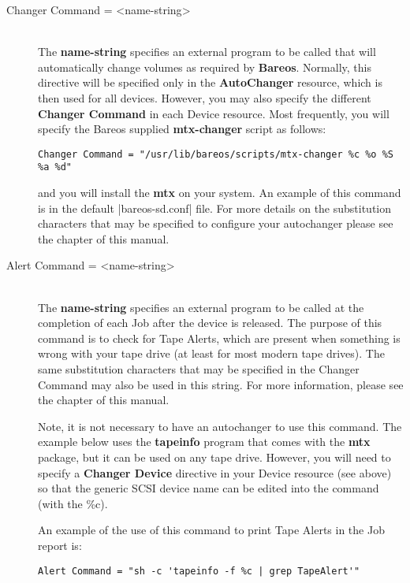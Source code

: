 \begin{description}
\item [Changer Command = {\textless}name-string{\textgreater}] \hfill \\
The {\bf name-string} specifies an external program to be called  that will
automatically change volumes as required by {\bf Bareos}.  Normally,
this directive will be specified only in the {\bf AutoChanger} resource,
which is then used for all devices.  However, you may also specify
the different {\bf Changer Command} in each Device resource.
Most frequently,
you will specify the Bareos supplied {\bf mtx-changer}  script as follows:

\footnotesize
\begin{verbatim}
Changer Command = "/usr/lib/bareos/scripts/mtx-changer %c %o %S %a %d"
\end{verbatim}
\normalsize

and you will install the {\bf mtx} on your system.
An example of this command is in the default \file|bareos-sd.conf| file.
For more details on the substitution characters that may be specified  to
configure your autochanger please see  the
 chapter of this  manual.

\item [Alert Command = {\textless}name-string{\textgreater}] \hfill \\
The {\bf name-string} specifies an external program to be called at the
completion of each Job after the device is released.  The purpose of this
command is to check for Tape Alerts, which are present when something is
wrong with your tape drive (at least for most modern tape drives).  The same
substitution characters that may be specified in the Changer Command may
also be used in this string.  For more information, please see the
 chapter of this manual.

Note, it is not necessary to have an autochanger to use this command. The
example below uses the {\bf tapeinfo} program that comes with the {\bf mtx}
package, but it can be used on any tape drive. However, you will need to
specify a {\bf Changer Device} directive in your Device resource (see above)
so that the generic SCSI device name can be edited into the command (with
the \%c).

An example of the use of this command to print Tape Alerts  in the Job report
is:

\footnotesize
\begin{verbatim}
Alert Command = "sh -c 'tapeinfo -f %c | grep TapeAlert'"


\end{verbatim}
\end{description}
